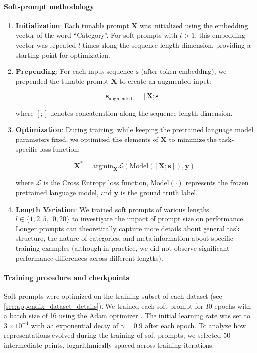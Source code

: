\paragraph{Soft-prompt methodology}

\begin{enumerate}
    \item \textbf{Initialization}: Each tunable prompt $\mathbf{X}$ was initialized using the embedding vector of the word ``Category''. For soft prompts with $l > 1$, this embedding vector was repeated $l$ times along the sequence length dimension, providing a starting point for optimization.

    \item \textbf{Prepending}: For each input sequence $\mathbf{s}$ (after token embedding), we prepended the tunable prompt $\mathbf{X}$ to create an augmented input:
    
    \[ \mathbf{s}_\text{augmented} = [\mathbf{X}; \mathbf{s}] \]
    
    where $[;]$ denotes concatenation along the sequence length dimension.

    \item \textbf{Optimization}: During training, while keeping the pretrained language model parameters fixed, we optimized the elements of $\mathbf{X}$ to minimize the task-specific loss function:
    
    \[ \mathbf{X}^* = \text{argmin}_\mathbf{X} \mathcal{L}(\text{Model}([\mathbf{X}; \mathbf{s}]), \mathbf{y}) \]
    
    where $\mathcal{L}$ is the Cross Entropy loss function, $\text{Model}(\cdot)$ represents the frozen pretrained language model, and $\mathbf{y}$ is the ground truth label.

    \item \textbf{Length Variation}: We trained soft prompts of various lengths $l \in \{1,2,5,10,20\}$ to investigate the impact of prompt size on performance. Longer prompts can theoretically capture more details about general task structure, the nature of categories, and meta-information about specific training examples (although in practice, we did not observe significant performance differences across different lengths).
    
\end{enumerate}

\paragraph{Training procedure and checkpoints}

Soft prompts were optimized on the training subset of each dataset (see \cref{sec:appendix_dataset_details}). We trained each soft prompt for 30 epochs with a batch size of 16 using the Adam optimizer \cite{kingma2017adammethodstochasticoptimization}. The initial learning rate was set to $3 \times 10^{-4}$ with an exponential decay of $\gamma = 0.9$ after each epoch.
To analyze how representations evolved during the training of soft prompts, we selected 50 intermediate points, logarithmically spaced across training iterations.